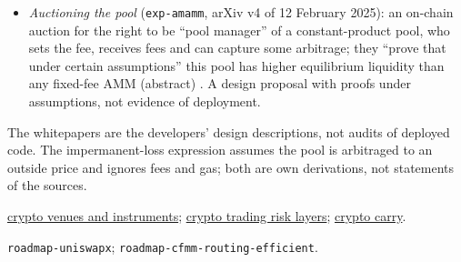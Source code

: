 \begin{qfdefinition}
\begin{itemize}
\item \emph{Auctioning the pool} (\nolinkurl{exp-amamm}, arXiv v4 of 12 February 2025): an on-chain auction for the right to be ``pool manager'' of a constant-product pool, who sets the fee, receives fees and can capture some arbitrage; they ``prove that under certain assumptions'' this pool has higher equilibrium liquidity than any fixed-fee AMM (abstract) \citep[arXiv v4, abstract]{exp-amamm}. A design proposal with proofs under assumptions, not evidence of deployment.
\end{itemize}

 The whitepapers are the developers' design descriptions, not audits of deployed code. The impermanent-loss expression assumes the pool is arbitraged to an outside price and ignores fees and gas; both are own derivations, not statements of the sources.

 \hyperref[def:crypto-venue-instrument-structure]{crypto venues and instruments}; \hyperref[def:crypto-trading-risk-layers]{crypto trading risk layers}; \hyperref[ev:crypto-dated-futures-carry]{crypto carry}.

 \nolinkurl{roadmap-uniswapx}; \nolinkurl{roadmap-cfmm-routing-efficient}.

\end{qfdefinition}
